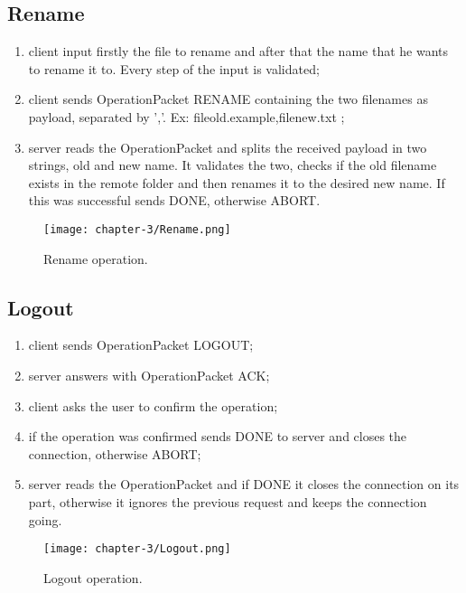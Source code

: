 \subsection{Rename}
\begin{enumerate}
	\item client input firstly the file to rename and after that the name that he wants to rename it to. Every step of the input is validated;
	\item client sends OperationPacket RENAME containing the two filenames as payload, separated by ','. Ex: fileold.example,filenew.txt ;
	\item server reads the OperationPacket and splits the received payload in two strings, old and new name. It validates the two, checks if the old filename exists in the remote folder and then renames it to the desired new name. If this was successful sends DONE, otherwise ABORT.
\end{enumerate}

\begin{figure}[!h] 
    \centering 
    \texttt{[image: chapter-3/Rename.png]} 
    \caption{Rename operation.}
    \label{fig:rename_operation}
\end{figure}
\newpage{}
\subsection{Logout}
\begin{enumerate}
	\item client sends OperationPacket LOGOUT;
	\item server answers with OperationPacket ACK;
	\item client asks the user to confirm the operation;
	\item if the operation was confirmed sends DONE to server and closes the connection, otherwise ABORT;
	\item server reads the OperationPacket and if DONE it closes the connection on its part, otherwise it ignores the previous request and keeps the connection going.
\end{enumerate}


\begin{figure}[!h] 
    \centering 
    \texttt{[image: chapter-3/Logout.png]} 
    \caption{Logout operation.}
    \label{fig:logout_operation}
\end{figure}
